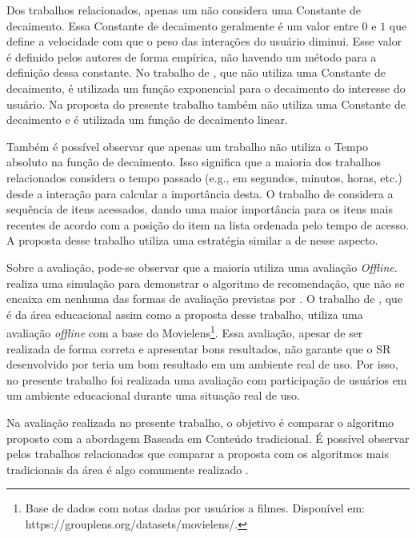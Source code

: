 Dos trabalhos relacionados, apenas um não considera uma Constante de decaimento. Essa Constante de decaimento geralmente
é um valor entre $0$ e $1$ que define a velocidade com que o peso das interações do usuário diminui. Esse valor é definido
pelos autores de forma empírica, não havendo um método para a definição dessa constante. No trabalho de ,
que não utiliza uma Constante de decaimento, é utilizada um função exponencial para o decaimento do interesse do usuário. Na
proposta do presente trabalho também não utiliza uma Constante de decaimento e é utilizada um função de decaimento linear.

Também é possível observar que apenas um trabalho não utiliza o Tempo absoluto na função de decaimento. Isso significa que
a maioria dos trabalhos relacionados considera o tempo passado (e.g., em segundos, minutos, horas, etc.) desde a interação
para calcular a importância desta. O trabalho de  considera a sequência de itens acessados, dando
uma maior importância para os itens mais recentes de acordo com a posição do item na lista ordenada pelo tempo de acesso.
A proposta desse trabalho utiliza uma estratégia similar a de  nesse aspecto.

Sobre a avaliação, pode-se observar que a maioria utiliza uma avaliação \textit{Offline}.  realiza
uma simulação para demonstrar o algoritmo de recomendação, que não se encaixa em nenhuma das formas de avaliação
previstas por . O trabalho de , que é da área educacional assim como a
proposta desse trabalho, utiliza uma avaliação \textit{offline} com a base do Movielens\footnote{Base de dados com
notas dadas por usuários a filmes. Disponível em: https://grouplens.org/datasets/movielens/.}.
Essa avaliação, apesar de ser realizada de forma correta e apresentar bons resultados, não garante que o SR desenvolvido por 
teria um bom resultado em um ambiente real de uso. Por isso, no presente trabalho foi realizada uma avaliação com
participação de usuários em um ambiente educacional durante uma situação real de uso.

Na avaliação realizada no presente trabalho, o objetivo é comparar o algoritmo proposto com a abordagem Baseada
em Conteúdo tradicional. É possível observar pelos trabalhos relacionados que comparar a proposta com os algoritmos mais
tradicionais da área é algo comumente realizado \cite{fan2015modeling, luo2010context, hawalah2014utilizing, qiao2015personalized, wei2013web}.

